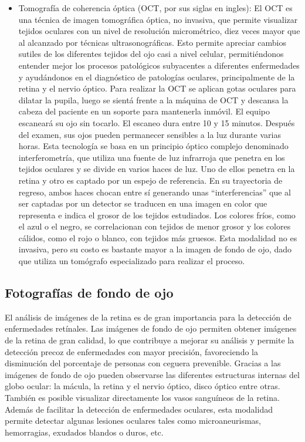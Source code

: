 \begin{itemize}
\item Tomograf\'ia de coherencia \'optica (OCT, por sus siglas en ingles): El OCT es una t\'ecnica de imagen tomogr\'afica \'optica, no invasiva, que permite visualizar tejidos oculares con un nivel de resoluci\'on microm\'etrico, diez veces mayor que al alcanzado por t\'ecnicas ultrasonogr\'aficas. Esto permite apreciar cambios sutiles de los diferentes tejidos del ojo casi a nivel celular, permiti\'endonos entender mejor los procesos patol\'ogicos subyacentes a diferentes enfermedades y ayud\'andonos en el diagn\'ostico de patolog\'ias oculares, principalmente de la retina y el nervio \'optico. Para realizar la OCT se aplican  gotas oculares para dilatar la pupila, luego se sient\'a frente a la m\'aquina de OCT y descansa  la cabeza del paciente en un soporte para mantenerla inm\'ovil. El equipo escanear\'a su ojo sin tocarlo. El escaneo dura entre 10 y 15 minutos. Despu\'es del examen, sus ojos pueden permanecer sensibles a la luz durante varias horas. Esta tecnolog\'ia se basa en un principio \'optico complejo denominado interferometr\'ia, que utiliza una fuente de luz infrarroja que penetra en los tejidos oculares y se divide en varios haces de luz. Uno de ellos penetra en la retina y otro es captado por un espejo de referencia. En su trayectoria de regreso, ambos haces chocan entre s\'i generando unas “interferencias” que al ser captadas por un detector se traducen en una imagen en color que representa e indica el grosor de los tejidos estudiados. Los colores fr\'ios, como el azul o el negro, se correlacionan con tejidos de menor grosor y los colores c\'alidos, como el rojo o blanco, con tejidos m\'as gruesos. 
Esta modalidad no es invasiva, pero su costo es bastante mayor a la imagen de fondo de ojo, dado que utiliza un tom\'ografo especializado para realizar el proceso.
\end{itemize}



\subsection{Fotograf\'ias de fondo de ojo}

El an\'alisis de im\'agenes de la retina es de gran importancia para la detecci\'on de enfermedades ret\'inales. Las imágenes de fondo de ojo permiten obtener im\'agenes de la retina de gran calidad, lo que contribuye a mejorar su an\'alisis y permite la detecci\'on precoz de enfermedades con mayor precisi\'on, favoreciendo la disminuci\'on del porcentaje de personas con ceguera prevenible. 
Gracias a las im\'agenes de fondo de ojo pueden observarse las diferentes estructuras internas del globo ocular: la m\'acula, la retina y el nervio \'optico, disco \'optico entre otras. Tambi\'en es posible visualizar directamente los vasos sangu\'ineos de la retina. Adem\'as de facilitar la detecci\'on de enfermedades oculares, esta modalidad permite detectar algunas lesiones oculares tales como microaneurismas, hemorragias, exudados blandos o duros, etc.

